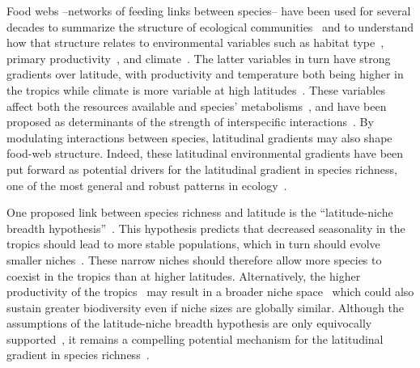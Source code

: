 \documentclass[12pt]{article}
\begin{document}
  Food webs --networks of feeding links between species-- have been used for several decades to summarize the structure of 
  ecological communities~\citep{Petchey2008,Williams2000,Paine1966} and to understand how that structure relates to environmental variables 
  such as habitat type~\citep{Shurin2006,Briand1983}, primary productivity~\citep{Vermaat2009,Thompson2005a,Townsend1998}, and climate~\citep{Baiser2012,Petchey2010}. The latter
  variables in turn have strong gradients over latitude, with productivity and temperature both being higher in the tropics while 
  climate is more variable at high latitudes~\citep{Field1998}. These variables affect both the resources available and species' 
  metabolisms~\citep{Hechinger2011,White2011,OConnor2009,White2007}, and have been proposed as determinants of the strength of 
  interspecific interactions~\citep{Lang2012,Schleuning2012,Schemske2009}. 
  By modulating interactions between species, latitudinal gradients may also shape food-web structure.
  Indeed, these latitudinal environmental gradients have been put forward as potential drivers for the 
  latitudinal gradient in species richness, one of the most general and robust patterns in ecology~\citep{Schemske2009a,Macpherson2002,Kaufman1995}.



  One proposed link between species richness and latitude is the ``latitude-niche breadth hypothesis''~\citep{Vazquez2004}. 
  This hypothesis predicts that decreased seasonality in the tropics should lead to more stable populations, which in
  turn should evolve smaller niches~\citep{Vazquez2004}. These narrow niches should therefore allow more species to 
  coexist in the tropics than at higher latitudes. Alternatively, the higher productivity of the tropics~\citep{Brown2004}
  may result in a broader niche space~\citep{Davies2007} which could also sustain greater biodiversity even if niche 
  sizes are globally similar. Although the assumptions of the latitude-niche breadth hypothesis are only equivocally 
  supported~\citep{Vazquez2004}, it remains a compelling potential mechanism for the latitudinal gradient in species 
  richness~\citep{Lappalainen2006,Krasnov2008,Slove2010}. 
\end{document}
